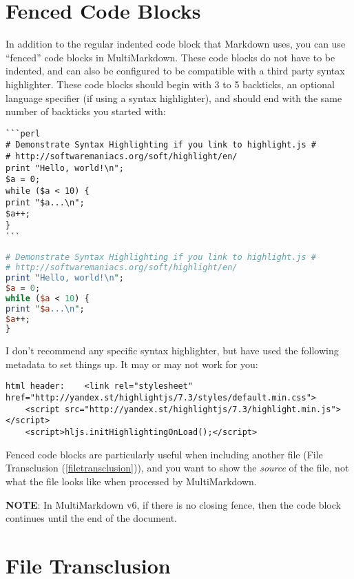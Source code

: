 \section{Fenced Code Blocks}
\label{fencedcodeblocks}

In addition to the regular indented code block that Markdown uses, you can use ``fenced'' code blocks in MultiMarkdown. These code blocks do not have to be indented, and can also be configured to be compatible with a third party syntax highlighter. These code blocks should begin with 3 to 5 backticks, an optional language specifier (if using a syntax highlighter), and should end with the same number of backticks you started with:

\begin{verbatim}
```perl
# Demonstrate Syntax Highlighting if you link to highlight.js #
# http://softwaremaniacs.org/soft/highlight/en/
print "Hello, world!\n";
$a = 0;
while ($a < 10) {
print "$a...\n";
$a++;
}
```
\end{verbatim}

\begin{lstlisting}[language=perl]
# Demonstrate Syntax Highlighting if you link to highlight.js #
# http://softwaremaniacs.org/soft/highlight/en/
print "Hello, world!\n";
$a = 0;
while ($a < 10) {
print "$a...\n";
$a++;
}
\end{lstlisting}

I don't recommend any specific syntax highlighter, but have used the following metadata to set things up. It may or may not work for you:

\begin{verbatim}
html header:	<link rel="stylesheet" href="http://yandex.st/highlightjs/7.3/styles/default.min.css">
	<script src="http://yandex.st/highlightjs/7.3/highlight.min.js"></script>
	<script>hljs.initHighlightingOnLoad();</script>
\end{verbatim}

Fenced code blocks are particularly useful when including another file (File Transclusion (\autoref{filetransclusion})), and you want to show the \emph{source} of the file, not what the file looks like when processed by MultiMarkdown.

\textbf{NOTE}: In MultiMarkdown v6, if there is no closing fence, then the code block continues until the end of the document.

\section{File Transclusion}
\label{filetransclusion}

